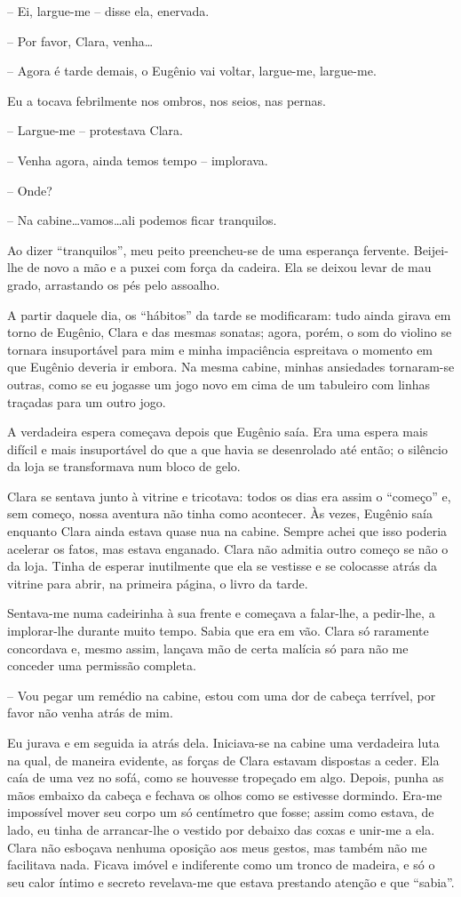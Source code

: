 -- Ei, largue-me -- disse ela, enervada.

-- Por favor, Clara, venha\dots

-- Agora é tarde demais, o Eugênio vai voltar, largue-me, largue-me.

Eu a tocava febrilmente nos ombros, nos seios, nas pernas.

-- Largue-me -- protestava Clara.

-- Venha agora, ainda temos tempo -- implorava.

-- Onde?

-- Na cabine\dots vamos\dots ali podemos ficar tranquilos.

Ao dizer ``tranquilos'', meu peito preencheu-se de uma esperança fervente. Beijei-lhe de novo a mão e a puxei com força da cadeira. Ela se deixou levar de mau grado, arrastando os pés pelo assoalho.

A partir daquele dia, os ``hábitos'' da tarde se modificaram: tudo ainda girava em torno de Eugênio, Clara e das mesmas sonatas; agora, porém, o som do violino se tornara insuportável para mim e minha impaciência espreitava o momento em que Eugênio deveria ir embora. Na mesma cabine, minhas ansiedades tornaram-se outras, como se eu jogasse um jogo novo em cima de um tabuleiro com linhas traçadas para um outro jogo. 

A verdadeira espera começava depois que Eugênio saía. Era uma espera mais difícil e mais insuportável do que a que havia se desenrolado até então; o silêncio da loja se transformava num bloco de gelo.

Clara se sentava junto à vitrine e tricotava: todos os dias era assim o ``começo'' e, sem começo, nossa aventura não tinha como acontecer. Às vezes, Eugênio saía enquanto Clara ainda estava quase nua na cabine. Sempre achei que isso poderia acelerar os fatos, mas estava enganado. Clara não admitia outro começo se não o da loja. Tinha de esperar inutilmente que ela se vestisse e se colocasse atrás da vitrine para abrir, na primeira página, o livro da tarde.

Sentava-me numa cadeirinha à sua frente e começava a falar-lhe, a pedir-lhe, a implorar-lhe durante muito tempo. Sabia que era em vão. Clara só raramente concordava e, mesmo assim, lançava mão de certa malícia só para não me conceder uma permissão completa.

-- Vou pegar um remédio na cabine, estou com uma dor de cabeça terrível, por favor não venha atrás de mim.

Eu jurava e em seguida ia atrás dela. Iniciava-se na cabine uma verdadeira luta na qual, de maneira evidente, as forças de Clara estavam dispostas a ceder. Ela caía de uma vez no sofá, como se houvesse tropeçado em algo. Depois, punha as mãos embaixo da cabeça e fechava os olhos como se estivesse dormindo. Era-me impossível mover seu corpo um só centímetro que fosse; assim como estava, de lado, eu tinha de arrancar-lhe o vestido por debaixo das coxas e unir-me a ela. Clara não esboçava nenhuma oposição aos meus gestos, mas também não me facilitava nada. Ficava imóvel e indiferente como um tronco de madeira, e só o seu calor íntimo e secreto revelava-me que estava prestando atenção e que ``sabia''.


